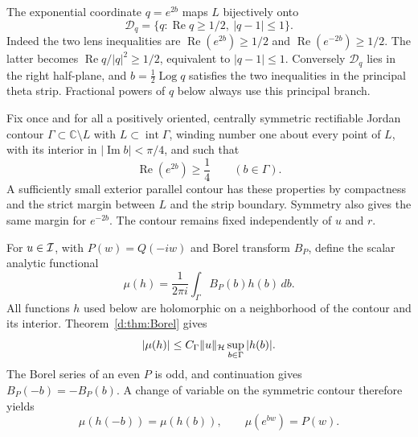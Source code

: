 \documentclass[11pt,a4paper]{article}
\numberwithin{equation}{section}
\theoremstyle{definition}\newtheorem{definition}[theorem]{Definition}
\theoremstyle{remark}\newtheorem{remark}[theorem]{Remark}
\newcommand{\Hh}{\mathcal H}\newcommand{\Hw}{\mathcal H}
\begin{document}
The exponential coordinate $q=e^{2b}$ maps $L$ bijectively onto
\begin{equation}\label{d:eq:q-domain}
 \mathcal D_q=\{q:\operatorname{Re}q\ge1/2,\ |q-1|\le1\}.
\end{equation}
Indeed the two lens inequalities are
$\operatorname{Re}(e^{2b})\ge1/2$ and
$\operatorname{Re}(e^{-2b})\ge1/2$. The latter becomes
$\operatorname{Re}q/|q|^2\ge1/2$, equivalent to $|q-1|\le1$.
Conversely $\mathcal D_q$ lies in the right half-plane, and
$b=\frac12\operatorname{Log}q$ satisfies the two inequalities in the principal theta strip. Fractional powers of $q$ below always use this principal branch.

Fix once and for all a positively oriented, centrally symmetric rectifiable Jordan contour $\Gamma\subset\mathbb C\setminus L$ with $L\subset\operatorname{int}\Gamma$, winding number one about every point of $L$, with its interior in $|\operatorname{Im}b|<\pi/4$, and such that
\begin{equation}\label{d:eq:fixed-contour-margin}
 \operatorname{Re}(e^{2b})\ge\frac14\qquad(b\in\Gamma).
\end{equation}
A sufficiently small exterior parallel contour has these properties by compactness and the strict margin between $L$ and the strip boundary. Symmetry also gives the same margin for $e^{-2b}$. The contour remains fixed independently of $u$ and $r$.

For $u\in\mathcal I$, with $P(w)=Q(-iw)$ and Borel transform $B_P$, define the scalar analytic functional
\begin{equation}\label{d:eq:mu-functional}
 \mu(h)=\frac1{2\pi i}\int_\Gamma B_P(b)h(b)\,db.
\end{equation}
All functions $h$ used below are holomorphic on a neighborhood of the contour and its interior. Theorem~\ref{d:thm:Borel} gives
\begin{equation}\label{d:eq:mu-bound}
 |\mu(h)|\le C_\Gamma\norm{u}_{\Hh}\sup_{b\in\Gamma}|h(b)|.
\end{equation}
The Borel series of an even $P$ is odd, and continuation gives
$B_P(-b)=-B_P(b)$. A change of variable on the symmetric contour therefore yields
\begin{equation}\label{d:eq:mu-symmetry}
 \mu(h(-b))=\mu(h(b)),\qquad \mu(e^{bw})=P(w).
\end{equation}
\end{document}
